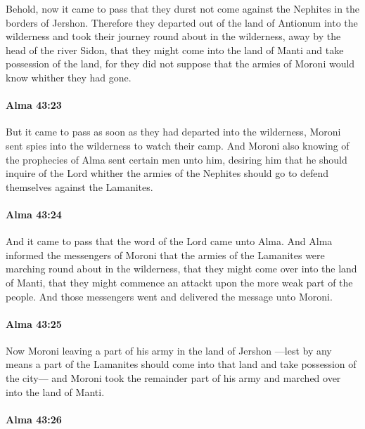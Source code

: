 			Behold, now it came to pass that
			they durst not come against the Nephites in the borders of Jershon.
			Therefore they departed out of the land of Antionum into the wilderness
			and took their journey round about in the wilderness,
			away by the head of the river Sidon,
			that they might come into the land of Manti and take possession of the land,
			for they did not suppose
			that the armies of Moroni would know whither they had gone.

		\paragraph{Alma 43:23} %
			\label{ALMA-43-23}

			But it came to pass as soon as they had departed into the wilderness,
			Moroni sent spies into the wilderness to watch their camp.
			And Moroni also knowing of the prophecies of Alma sent certain men unto him,
			desiring him that he should inquire of the Lord
			whither the armies of the Nephites should go
			to defend themselves against the Lamanites.

		\paragraph{Alma 43:24} %
			\label{ALMA-43-24}

			And it came to pass that the word of the Lord came unto Alma.
			And Alma informed the messengers of Moroni
			that the armies of the Lamanites were marching round about in the wilderness,
			that they might come over into the land of Manti,
			that they might commence an attackt upon the more weak part of the people.
			And those messengers went and delivered the message unto Moroni.

		\paragraph{Alma 43:25} %
			\label{ALMA-43-25}

			Now Moroni leaving a part of his army in the land of Jershon
			---lest by any means a part of the Lamanites should come into that land
			and take possession of the city---
			and Moroni took the remainder part of his army
			and marched over into the land of Manti.

		\paragraph{Alma 43:26} %
			\label{ALMA-43-26}

